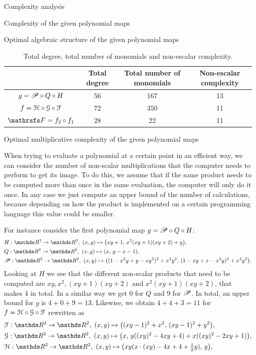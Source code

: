 \documentclass[11pt, a4paper, english, twoside, notitlepage, openright]{report}
\begin{document}
\begin{chapter}{Complexity analysis}
\begin{section}{Complexity of the given polynomial maps}
\begin{subsection}{Optimal algebraic structure of the given polynomial maps}
\begin{table}[t]
\begin{center}
\begin{tabular}{c || c | c | c}
& Total degree & Total number of monomials & Non-escalar complexity\\ \hline \hline
$g = \P\circ Q \circ H$ & 56 & 167 & 13 \\ \hline
$f=\HH\circ\GG\circ\FF$ & 72 &  350 & 11\\ \hline
$\FFF = f_2 \circ f_1$ & 28 & 22 & 11\\	
\end{tabular}
\caption{Total degree, total number of monomials and non-escalar complexity.}\label{tab:degreeMon}
\end{center}
\end{table}

\end{subsection}

\begin{subsection}{Optimal multiplicative complexity of the given polynomial maps}

When trying to evaluate a polynomial at a certain point in an efficient way, we can consider the number of non-scalar multiplications that the computer needs to perform to get its image. To do this, we assume that if the same product needs to be computed more than once in the same evaluation, the computer will only do it once. In any case we just compute an upper bound of the number of calculations, because depending on how the product is implemented on a certain programming language this value could be smaller.

For instance consider the first polynomial map $g = \P\circ Q \circ H$:
\begin{align*}
&H:\R^2\to\R^2,\ (x,y)\mapsto\big(xy+1,\, x^2(xy+1)(xy+2)+y\big), \\
&Q:\R^2\to\R^2,\ (x,y)\mapsto(x,\, y-x-1), \\
&\P:\R^2\to\R^2,\ (x,y)\mapsto\big((1-x^3y+y-xy^2)^2+x^4y^2,\, (1-xy+x-x^4y)^2+x^4y^2\big).\\
\end{align*}
Looking at $H$ we see that the different non-scalar products that need to be computed are $xy, x^2, (xy + 1)(xy+2) \text{ and } x^2(xy + 1)(xy+2)$, that makes 4 in total. In a similar way we get 0 for $Q$ and $9$ for $\P$. In total, an upper bound for $g$ is $4 + 0 + 9 = 13$. Likewise, we obtain $4+4+3=11$ for $f=\HH\circ\GG\circ\FF$ rewritten as
\begin{align*}
&\FF:\R^2\to\R^2,\  (x,y)\mapsto\big((xy-1)^2+x^2,\, (xy-1)^2+y^2\big),\\
&\GG:\R^2\to\R^2,\  (x,y)\mapsto\big(x,\, y((xy)^2-4xy+4)+x((xy)^2-2xy+1)\big),\\
&\HH:\R^2\to\R^2,\  (x,y)\mapsto\big(xy(x\cdot(xy)-4x+4+\tfrac{1}{2}y),\, y\big),
\end{align*}


\end{subsection}
\end{section}
\end{chapter}
\end{document}
